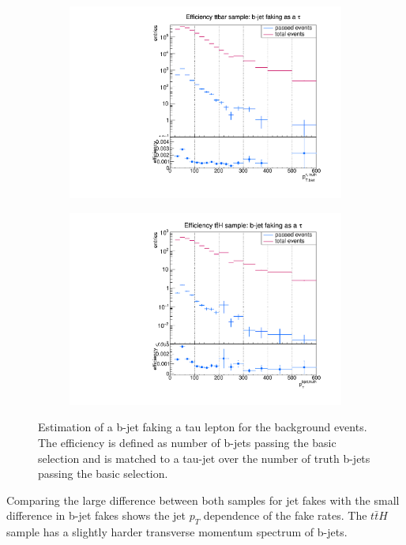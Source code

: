 \begin{figure}
  \centering
                \begin{subfigure}[t]{0.49\textwidth}
                \includegraphics[width=\textwidth]{figures/plots/ttbar/Divided_Bjet.pdf}
                \label{DividedBjet:bg:ttbar}
                \end{subfigure}
                \begin{subfigure}[t]{0.49\textwidth}
                \includegraphics[width=\textwidth]{figures/plots/ttH/Divided_Bjet.pdf}
                \label{DividedBjet:bg:ttH}
                \end{subfigure}
\caption[Estimation of a b-jet faking a tau lepton for the background events.]{Estimation of a b-jet faking a tau lepton for the background events. The efficiency is defined as number of b-jets passing the basic selection and is matched to a tau-jet over the number of truth b-jets passing the basic selection.}
\label{DividedBjet:bg}
\end{figure}
%
Comparing the large difference between both samples for jet fakes with the small difference in b-jet fakes shows the jet $p_T$ dependence of the fake rates. The $t\bar{t}H$ sample has a slightly harder transverse momentum spectrum of b-jets. 

